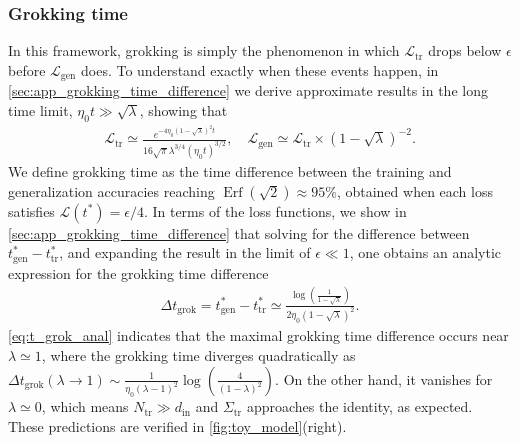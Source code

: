 \documentclass[a4paper,11pt]{article}
\newcommand{\loss}{\mathcal{L}}
\newcommand{\din}{d_\mathrm{in}}
\newcommand{\training}{\mathrm{tr}}
\newcommand{\gen}{\mathrm{gen}}
\begin{document}
\subsubsection{Grokking time}
In this framework, grokking is simply the phenomenon in which $\loss_\training$ drops below $\epsilon$ before $\loss_\gen$ does. To understand exactly when these events happen, in \cref{sec:app_grokking_time_difference} we derive approximate results in the long time limit, $\eta_0 t \gg \sqrt{\lambda}$, showing that
\begin{align}
    \label{eq:approx_losses}
    \mathcal{L}_\training
    \simeq
    \frac{e^{-4 \eta_0  \left(1-\sqrt{\lambda }\right)^2 t}}{16 \sqrt{\pi } \lambda ^{3/4} (\eta_0  t)^{3/2}}
    , \quad
      \mathcal{L}_\gen
    \simeq  
    \mathcal{L}_\training
    \times
    \left(1-\sqrt{\lambda }\right)^{-2}.
\end{align}
We define grokking time as the time difference between the training and generalization accuracies reaching $\operatorname{Erf}(\sqrt{2})\approx95\%$, obtained when each loss satisfies $\mathcal{L}(t^*)= \epsilon/4$. In terms of the loss functions, we show in \cref{sec:app_grokking_time_difference} that solving for the difference between $t^*_\gen-t^*_\training$, and expanding the result in the limit of $\epsilon \ll 1$, one obtains an analytic expression for the grokking time difference 
\begin{align}
\label{eq:t_grok_anal}
    \Delta t_\mathrm{grok}
    =
    t^*_\gen - t^*_\training
    \simeq
    \tfrac{\log \left(\frac{1}{1-\sqrt{\lambda }}\right)}{2 \eta_0  \left(1-\sqrt{\lambda }\right)^2}.
\end{align}
\cref{eq:t_grok_anal} indicates that the maximal grokking time difference occurs near $\lambda \simeq 1$, where the grokking time diverges quadratically as $\Delta t_\mathrm{grok}(\lambda\to1)\sim\frac{1}{\eta _0 (\lambda -1)^2}\log \left(\frac{4}{(1-\lambda )^2}\right)$. On the other hand, it vanishes for $\lambda \simeq 0$, which means $N_\training \gg \din $ and $\Sigma_\training$ approaches the identity, as expected. These predictions are verified in \cref{fig:toy_model}(right). 
\end{document}
